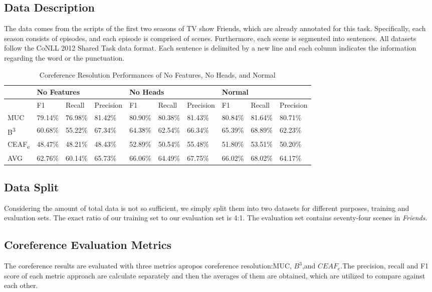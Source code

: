 \documentclass[11pt]{article}
\begin{document}
\subsection{Data Description}
The data comes from the scripts of the first two seasons of TV show Friends, which are already annotated for this task. Specifically, each season consists of episodes, and each episode is comprised of scenes. Furthermore, each scene is segmented into sentences. All datasets follow the CoNLL 2012 Shared Task data format. Each sentence is delimited by a new line and each column indicates the information regarding the word or the punctuation.
\begin{table}[]
\centering
\label{my-label}
\begin{tabular}{|l|l|l|l|l|l|l|l|l|l|}
\hline
        & \multicolumn{3}{l|}{No Features} & \multicolumn{3}{l|}{No Heads} & \multicolumn{3}{l|}{Normal}   \\ \hline
        & F1       & Recall   & Precision  & F1      & Recall  & Precision & F1      & Recall  & Precision \\ \hline
MUC     & 79.14\%  & 76.98\%  & 81.42\%    & 80.90\% & 80.38\% & 81.43\%   & 80.84\% & 81.64\% & 80.71\%   \\ \hline
B\textsuperscript{3}      & 60.68\%  & 55.22\%  & 67.34\%    & 64.38\% & 62.54\% & 66.34\%   & 65.39\% & 68.89\% & 62.23\%   \\ \hline
CEAF\textsubscript{e} & 48.47\%  & 48.21\%  & 48.43\%    & 52.89\% & 50.54\% & 55.48\%   & 51.80\% & 53.51\% & 50.20\%   \\ \hline
AVG     & 62.76\%  & 60.14\%  & 65.73\%    & 66.06\% & 64.49\% & 67.75\%   & 66.02\% & 68.02\% & 64.17\%   \\ \hline
\end{tabular}
\caption{Coreference Resolution Performances of No Features, No Heads, and Normal}
\end{table}
\subsection{Data Split}
Considering the amount of total data is not so sufficient, we simply split them into two datasets for different purposes, training and evaluation sets. The exact ratio of our training set to our evaluation set is 4:1. The evaluation set contains seventy-four scenes in \textit{Friends}.

\subsection{Coreference Evaluation Metrics}
The coreference results are evaluated with three metrics apropos coreference resolution:MUC, $B^{3}$,and $CEAF_e$.The precision, recall and F1 score of each metric approach are calculate separately and then the averages of them are obtained, which are utilized to compare against each other.
\end{document}
